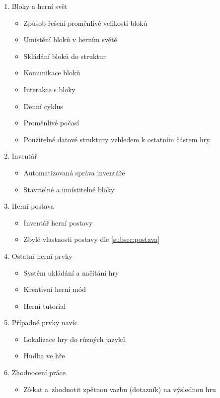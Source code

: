 \begin{enumerate}

 \item Bloky a herní svět
\begin{itemize}
	\item Způsob řešení proměnlivé velikosti bloků
	\item Umístění bloků v herním světě
	\item Skládání bloků do struktur
	\item Komunikace bloků
	\item Interakce s bloky
	\item Denní cyklus
	\item Proměnlivé počasí
	\item Použitelné datové struktury vzhledem k ostatním částem hry
\end{itemize}

 \item Inventář
\begin{itemize}
	\item Automatizovaná správa inventáře
	\item Stavitelné a umístitelné bloky
\end{itemize}

 \item Herní postava
\begin{itemize}
	\item Inventář herní postavy
	\item Zbylé vlastnosti postavy dle \ref{subsec:postava}
\end{itemize}

 \item Ostatní herní prvky
\begin{itemize}
	\item Systém ukládání a načítání hry
	\item Kreativní herní mód
	\item Herní tutorial
\end{itemize}

 \item Případné prvky navíc
\begin{itemize}
	\item Lokalizace hry do různých jazyků
	\item Hudba ve hře
\end{itemize}

 \item Zhodnocení práce
\begin{itemize}
	\item Získat a~zhodnotit zpětnou vazbu (dotazník) na výslednou hru
\end{itemize}


\end{enumerate}
